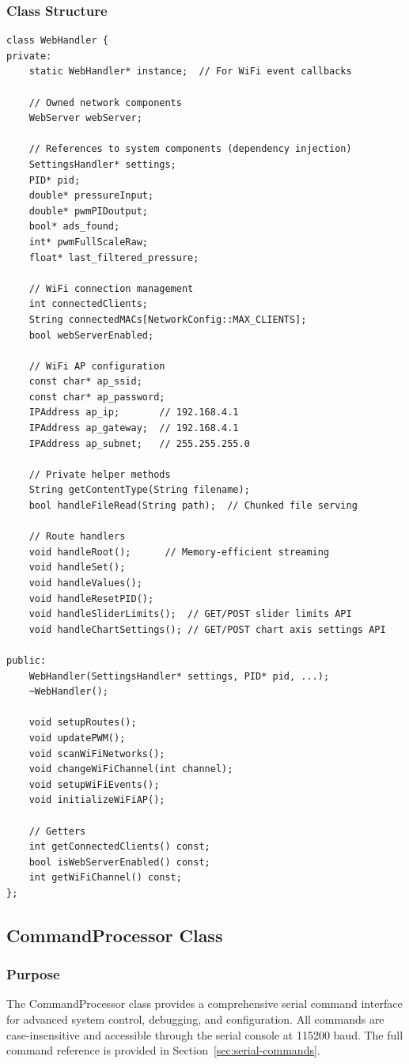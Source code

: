 \subsubsection{Class Structure}
\begin{lstlisting}[caption=WebHandler Class - Actual Implementation]
class WebHandler {
private:
    static WebHandler* instance;  // For WiFi event callbacks
    
    // Owned network components
    WebServer webServer;
    
    // References to system components (dependency injection)
    SettingsHandler* settings;
    PID* pid;
    double* pressureInput;
    double* pwmPIDoutput;
    bool* ads_found;
    int* pwmFullScaleRaw;
    float* last_filtered_pressure;
    
    // WiFi connection management
    int connectedClients;
    String connectedMACs[NetworkConfig::MAX_CLIENTS];
    bool webServerEnabled;
    
    // WiFi AP configuration
    const char* ap_ssid;
    const char* ap_password;
    IPAddress ap_ip;       // 192.168.4.1
    IPAddress ap_gateway;  // 192.168.4.1
    IPAddress ap_subnet;   // 255.255.255.0
    
    // Private helper methods
    String getContentType(String filename);
    bool handleFileRead(String path);  // Chunked file serving
    
    // Route handlers
    void handleRoot();      // Memory-efficient streaming
    void handleSet();
    void handleValues();
    void handleResetPID();
    void handleSliderLimits();  // GET/POST slider limits API
    void handleChartSettings(); // GET/POST chart axis settings API
    
public:
    WebHandler(SettingsHandler* settings, PID* pid, ...);
    ~WebHandler();
    
    void setupRoutes();
    void updatePWM();
    void scanWiFiNetworks();
    void changeWiFiChannel(int channel);
    void setupWiFiEvents();
    void initializeWiFiAP();
    
    // Getters
    int getConnectedClients() const;
    bool isWebServerEnabled() const;
    int getWiFiChannel() const;
};
\end{lstlisting}

\subsection{CommandProcessor Class}

\subsubsection{Purpose}
The CommandProcessor class provides a comprehensive serial command interface for advanced system control, debugging, and configuration. All commands are case-insensitive and accessible through the serial console at 115200 baud. The full command reference is provided in Section~\ref{sec:serial-commands}.

